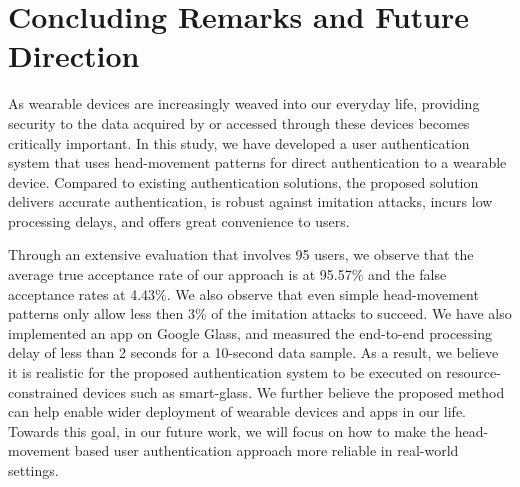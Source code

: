 \section{Concluding Remarks and Future Direction}
\label{sec:conc}
As wearable devices are increasingly weaved into our everyday life, providing security to the data acquired by or accessed through these devices becomes critically important. In this study, we have developed a user authentication system that uses head-movement patterns for direct
authentication to a wearable device. Compared to existing authentication solutions, the proposed solution delivers accurate authentication, is robust against imitation attacks, incurs low processing delays, and offers great convenience to users.

Through an extensive evaluation that involves 95 users, we observe that the
average true acceptance rate of our approach is at 95.57$\%$ and the false
acceptance rates at 4.43$\%$. We also observe that even simple head-movement patterns only allow less then 3\% of the imitation attacks to succeed. We have also implemented an app on Google Glass, and measured the end-to-end processing delay of less than 2 seconds for a 10-second data sample. As a result, we believe it is realistic for the proposed authentication system to be executed on resource-constrained devices such as smart-glass. We further believe the proposed method can help enable wider deployment of wearable devices and apps in our life. Towards this goal, in our future work, we will focus on how to make the head-movement based user authentication approach more reliable in real-world settings.

